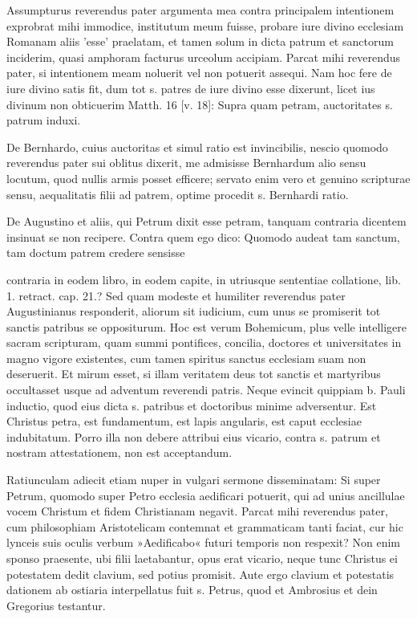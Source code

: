 Assumpturus reverendus pater argumenta mea contra principalem intentionem exprobrat mihi immodice, institutum meum fuisse, probare iure divino ecclesiam Romanam aliis 'esse' praelatam, et tamen solum in dicta patrum et sanctorum inciderim, quasi amphoram facturus urceolum accipiam. Parcat mihi reverendus pater, si intentionem meam noluerit vel non potuerit assequi. Nam hoc fere de iure divino satis fit, dum tot s. patres de iure divino esse dixerunt, licet ius divinum non obticuerim Matth. 16 [v. 18]: Supra quam petram, auctoritates s. patrum induxi.

\marginpar{\small[282]} De Bernhardo, cuius auctoritas et simul ratio est invincibilis, nescio quomodo reverendus pater sui oblitus dixerit, me admisisse Bernhardum alio sensu locutum, quod nullis armis posset efficere; servato enim vero et genuino scripturae sensu, aequalitatis filii ad patrem, optime procedit s. Bernhardi ratio.

De Augustino et aliis, qui Petrum dixit esse petram, tanquam contraria dicentem insinuat se non recipere. Contra quem ego dico: Quomodo audeat tam sanctum, tam doctum patrem credere sensisse

contraria in eodem libro, in eodem capite, in utriusque sententiae collatione, lib. 1. retract. cap. 21.? Sed quam modeste et humiliter reverendus pater Augustinianus responderit, aliorum sit iudicium, cum unus se promiserit tot sanctis patribus se oppositurum. Hoc est verum Bohemicum, plus velle intelligere sacram scripturam, quam summi pontifices, concilia, doctores et universitates in magno vigore existentes, cum tamen spiritus sanctus ecclesiam suam non deseruerit. Et mirum esset, si illam veritatem deus tot sanctis et martyribus occultasset usque ad adventum reverendi patris. Neque evincit quippiam b. Pauli inductio, quod eius dicta s. patribus et doctoribus minime adversentur. Est Christus petra, est fundamentum, est lapis angularis, est caput ecclesiae indubitatum. Porro illa non debere attribui eius vicario, contra s. patrum et nostram attestationem, non est acceptandum.

Ratiunculam adiecit etiam nuper in vulgari sermone disseminatam: Si super Petrum, quomodo super Petro ecclesia aedificari potuerit, qui ad unius ancillulae vocem Christum et fidem Christianam negavit. Parcat mihi reverendus pater, cum philosophiam Aristotelicam contemnat et grammaticam tanti faciat, cur hic lynceis suis oculis verbum »Aedificabo« futuri temporis non respexit? Non enim sponso praesente, ubi filii laetabantur, opus erat vicario, neque tunc Christus ei potestatem dedit clavium, sed potius promisit. Aute ergo clavium et potestatis dationem ab ostiaria interpellatus fuit s. Petrus, quod et Ambrosius et dein Gregorius testantur.

